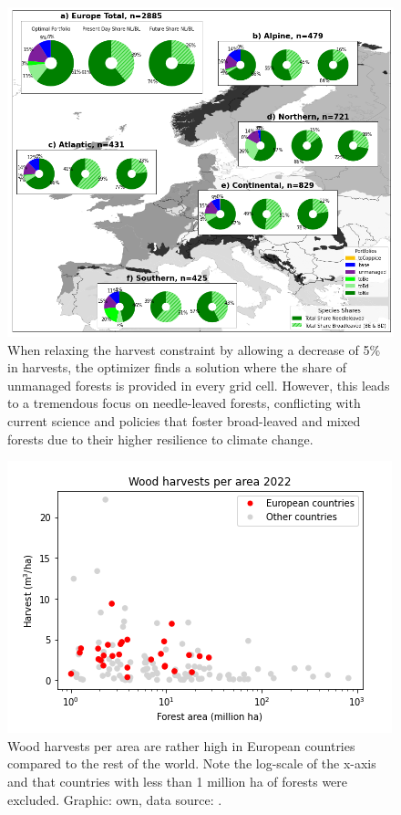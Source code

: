 \documentclass[]{article}
\begin{document}
\begin{figure}[h!]
	\centering
	\includegraphics[width=0.9\linewidth]{supplement_figs/unmanaged_cell_high_ne.png}
	\caption{When relaxing the harvest constraint by allowing a decrease of 5\% in harvests, the optimizer finds a solution where the share of unmanaged forests is provided in every grid cell. However, this leads to a tremendous focus on needle-leaved forests, conflicting with current science and policies that foster broad-leaved and mixed forests due to their higher resilience to climate change.}
	\label{fig:unmanaged-cell}
\end{figure}



\begin{figure}[h!]
	\centering
	\includegraphics[width=0.75\linewidth]{supplement_figs/fao_wood_harvests_europe_vs_rest.png}
	\caption{Wood harvests per area are rather high in European countries compared to the rest of the world. Note the log-scale of the x-axis and that countries with less than 1 million ha of forests were excluded. Graphic: own, data source: \textcite{FAOSTAT2022}.}
	\label{fig:faowoodharvest}
\end{figure}



\clearpage

\printbibliography[title=Supplementary References]
\end{document}
